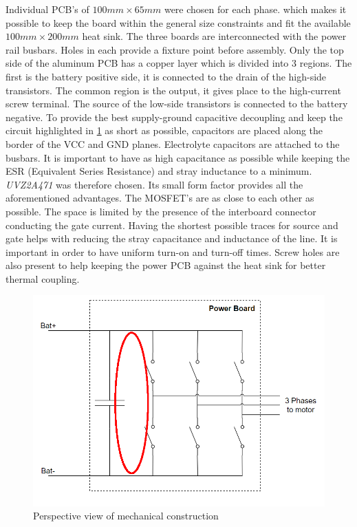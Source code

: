 Individual PCB's of $100mm \times 65mm$ were chosen for each phase. which makes it possible to keep the board within the general size constraints and fit the available $100mm \times 200mm$ heat sink. The three boards are interconnected with the power rail busbars. Holes in each provide a fixture point before assembly. Only the top side of the aluminum PCB has a copper layer which is divided into 3 regions. The first is the battery positive side, it is connected to the drain of the high-side transistors. The common region is the output, it gives place to the high-current screw terminal. The source of the low-side transistors is connected to the battery negative. To provide the best supply-ground capacitive decoupling and keep the circuit highlighted in \ref{fig:cap_circ} as short as possible, capacitors are placed along the border of the VCC and GND planes. Electrolyte capacitors are attached to the busbars. It is important to have as high capacitance as possible while keeping the ESR (Equivalent Series Resistance) and stray inductance to a minimum. \textit{UVZ2A471}\cite{elco} was therefore chosen. Its small form factor provides all the aforementioned advantages. The MOSFET's are as close to each other as possible. The space is limited by the presence of the interboard connector conducting the gate current. Having the shortest possible traces for source and gate helps with reducing the stray capacitance and inductance of the line. It is important in order to have uniform turn-on and turn-off times. Screw holes are also present to help keeping the power PCB against the heat sink for better thermal coupling.

\begin{figure}[H]
	\centering
	\includegraphics[width=1\textwidth]{pictures/hardware/Power_Board/Sketch_of_powerBoard_circulating.PNG}
	\caption{Perspective view of mechanical construction}
	\label{fig:cap_circ}
\end{figure}


